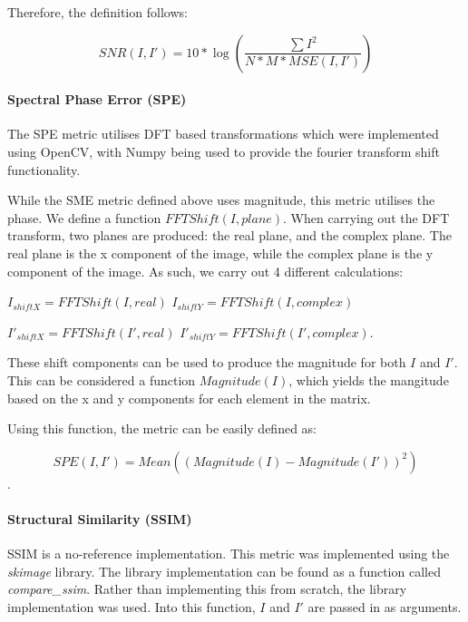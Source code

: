 \documentclass[11pt,a4paper]{article}
\begin{document}
                Therefore, the definition follows:

                $$SNR(I, I') = 10 * \log(\frac{\sum I^2}{N * M * MSE(I, I')})$$

            \paragraph{Spectral Phase Error (SPE)}
                The SPE metric utilises DFT based transformations which were implemented using OpenCV, with Numpy being used to provide the fourier transform shift functionality.

                While the SME metric defined above uses magnitude, this metric utilises the phase. We define a function $FFTShift(I, plane)$. When carrying out the DFT transform,
                two planes are produced: the real plane, and the complex plane. The real plane is the x component of the image, while the complex plane is the y component of the image.
                As such, we carry out 4 different calculations:

                $I_{shiftX} = FFTShift(I, real)$
                $I_{shiftY} = FFTShift(I, complex)$

                $I'_{shiftX} = FFTShift(I', real)$
                $I'_{shiftY} = FFTShift(I', complex)$.

                These shift components can be used to produce the magnitude for both $I$ and $I'$. This can be considered a function $Magnitude(I)$, which yields the mangitude based on the
                x and y components for each element in the matrix.

                Using this function, the metric can be easily defined as:

                $$SPE(I, I') = Mean((Magnitude(I) - Magnitude(I'))^2)$$.

            \paragraph{Structural Similarity (SSIM)}
                SSIM is a no-reference implementation. This metric was implemented using the \emph{skimage} library. The library implementation can be found as a function called \emph{compare\_ssim}.
                Rather than implementing this from scratch, the library implementation was used. Into this function, $I$ and $I'$ are passed
                in as arguments.
\end{document}
